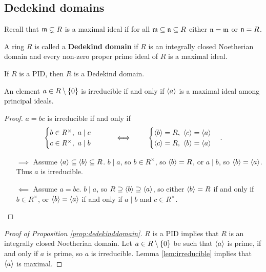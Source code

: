 \subsection{Dedekind domains}

Recall that $ \mathfrak{m} \subsetneq R $ is a maximal ideal if for all $ \mathfrak{m} \subseteq \mathfrak{n} \subseteq R $ either $ \mathfrak{n} = \mathfrak{m} $ or $ \mathfrak{n} = R $.

\begin{definition}
A ring $ R $ is called a \textbf{Dedekind domain} if $ R $ is an integrally closed Noetherian domain and every non-zero proper prime ideal of $ R $ is a maximal ideal.
\end{definition}

\begin{proposition}
\label{prop:dedekinddomain}
If $ R $ is a PID, then $ R $ is a Dedekind domain.
\end{proposition}

\begin{lemma}
\label{lem:irreducible}
An element $ a \in R \setminus \cbr{0} $ is irreducible if and only if $ \left\langle a \right\rangle $ is a maximal ideal among principal ideals.
\end{lemma}

\begin{proof}
$ a = bc $ is irreducible if and only if
$$
\begin{cases}
b \in R^\times, \ a \mid c \\
c \in R^\times, \ a \mid b
\end{cases}
\qquad \iff \qquad
\begin{cases}
\left\langle b \right\rangle = R, \ \left\langle c \right\rangle = \left\langle a \right\rangle \\
\left\langle c \right\rangle = R, \ \left\langle b \right\rangle = \left\langle a \right\rangle
\end{cases}.
$$
\begin{itemize}
\item[$ \implies $] Assume $ \left\langle a \right\rangle \subseteq \left\langle b \right\rangle \subseteq R $. $ b \mid a $, so $ b \in R^\times $, so $ \left\langle b \right\rangle = R $, or $ a \mid b $, so $ \left\langle b \right\rangle = \left\langle a \right\rangle $. Thus $ a $ is irreducible.
\item[$ \impliedby $] Assume $ a = bc $. $ b \mid a $, so $ R \supseteq \left\langle b \right\rangle \supseteq \left\langle a \right\rangle $, so either $ \left\langle b \right\rangle = R $ if and only if $ b \in R^\times $, or $ \left\langle b \right\rangle = \left\langle a \right\rangle $ if and only if $ a \mid b $ and $ c \in R^\times $.
\end{itemize}
\end{proof}

\begin{proof}[Proof of Proposition \ref{prop:dedekinddomain}]
$ R $ is a PID implies that $ R $ is an integrally closed Noetherian domain. Let $ a \in R \setminus \cbr{0} $ be such that $ \left\langle a \right\rangle $ is prime, if and only if $ a $ is prime, so $ a $ is irreducible. Lemma \ref{lem:irreducible} implies that $ \left\langle a \right\rangle $ is maximal.
\end{proof}

